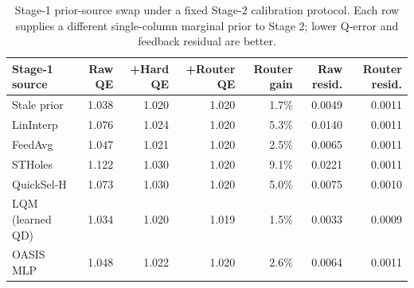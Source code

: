 \begin{table}[t]
  \centering
  \small
  \caption{Stage-1 prior-source swap under a fixed Stage-2 calibration protocol. Each row supplies a different single-column marginal prior to Stage 2; lower Q-error and feedback residual are better.}
  \label{tab:stage1_estimator_swap}
  \setlength{\tabcolsep}{4pt}
  \begin{tabular}{lrrrrrr}
    \toprule
    Stage-1 source & Raw QE & +Hard QE & +Router QE & Router gain & Raw resid. & Router resid. \\
    \midrule
    Stale prior & 1.038 & 1.020 & 1.020 & 1.7\% & 0.0049 & 0.0011 \\
    LinInterp & 1.076 & 1.024 & 1.020 & 5.3\% & 0.0140 & 0.0011 \\
    FeedAvg & 1.047 & 1.021 & 1.020 & 2.5\% & 0.0065 & 0.0011 \\
    STHoles & 1.122 & 1.030 & 1.020 & 9.1\% & 0.0221 & 0.0011 \\
    QuickSel-H & 1.073 & 1.030 & 1.020 & 5.0\% & 0.0075 & 0.0010 \\
    LQM (learned QD) & 1.034 & 1.020 & 1.019 & 1.5\% & 0.0033 & 0.0009 \\
    OASIS MLP & 1.048 & 1.022 & 1.020 & 2.6\% & 0.0064 & 0.0011 \\
    \bottomrule
  \end{tabular}
\end{table}

